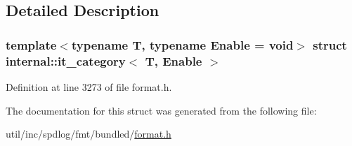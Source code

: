 \subsection{Detailed Description}
\subsubsection*{template$<$typename T, typename Enable = void$>$\newline
struct internal\+::it\+\_\+category$<$ T, Enable $>$}



Definition at line 3273 of file format.\+h.



The documentation for this struct was generated from the following file\+:\begin{DoxyCompactItemize}
\item 
util/inc/spdlog/fmt/bundled/\hyperlink{format_8h}{format.\+h}\end{DoxyCompactItemize}
